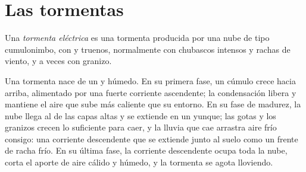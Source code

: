 \section{Las tormentas}

\begin{definition}\label{def:g10:storms-and-cyclones:thunderstorm}
Una \emph{tormenta eléctrica}
es una tormenta producida por una nube de tipo cumulonimbo, con  y
truenos, normalmente con chubascos intensos y rachas de viento, y a veces
con granizo.
\end{definition}

Una tormenta nace de un  y húmedo. En su primera fase, un
cúmulo crece hacia arriba, alimentado por una fuerte corriente ascendente;
la condensación libera  y mantiene el aire que sube más
caliente que su entorno. En su fase de madurez, la nube llega al  de las capas altas y se extiende en un yunque; las gotas y los
granizos crecen lo suficiente para caer, y la lluvia que cae arrastra aire
frío consigo: una corriente descendente que se extiende junto al suelo como
un frente de racha frío. En su última fase, la corriente descendente ocupa
toda la nube, corta el aporte de aire cálido y húmedo, y la tormenta se
agota lloviendo.

